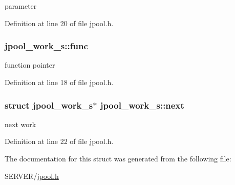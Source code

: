 parameter 



Definition at line 20 of file jpool.\-h.

\hypertarget{structjpool__work__s_ab4b175d459e42b292a6b5c30fd00a64a}{
\subsubsection[{func}]{ jpool\-\_\-work\-\_\-s\-::func}}\label{structjpool__work__s_ab4b175d459e42b292a6b5c30fd00a64a}


function pointer 



Definition at line 18 of file jpool.\-h.

\hypertarget{structjpool__work__s_a50c19091ea18636394875603e5e2e494}{
\subsubsection[{next}]{\setlength{\rightskip}{0pt plus 5cm}struct {\bf jpool\-\_\-work\-\_\-s}$\ast$ jpool\-\_\-work\-\_\-s\-::next}}\label{structjpool__work__s_a50c19091ea18636394875603e5e2e494}


next work 



Definition at line 22 of file jpool.\-h.



The documentation for this struct was generated from the following file\-:\begin{DoxyCompactItemize}
\item 
S\-E\-R\-V\-E\-R/\hyperlink{jpool_8h}{jpool.\-h}\end{DoxyCompactItemize}
